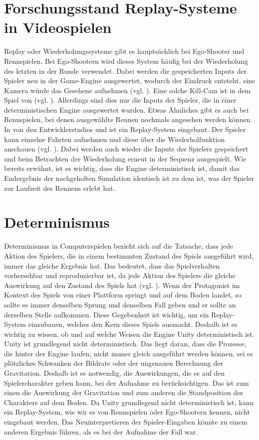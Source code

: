 \section{Forschungsstand Replay-Systeme in Videospielen}
Replay oder Wiederholungssysteme gibt es hauptsächlich bei Ego-Shooter und Rennspielen. Bei Ego-Shootern wird dieses System häufig bei der Wiederholung des letzten  in der Runde verwendet. Dabei werden die gespeicherten Inputs der Spieler neu in der Game-Engine ausgewertet, wodurch der Eindruck entsteht, eine Kamera würde das Gesehene aufnehmen (vgl. \cite{noauthor_new_nodate}). Eine solche Kill-Cam ist in dem Spiel  von  (vgl. \cite{noauthor_call_nodate}). Allerdings sind dies nur die Inputs der Spieler, die in einer deterministischen Engine ausgewertet wurden. Etwas Ähnliches gibt es auch bei Rennspielen, bei denen ausgewählte Rennen nochmals angesehen werden können. In  von den Entwicklerstudios  und  ist ein Replay-System eingebaut. Der Spieler kann einzelne Fahrten aufnehmen und diese über die Wiederholfunktion anschauen (vgl. \cite{noauthor_forza_nodate}). Dabei werden auch wieder die Inputs des Spielers gespeichert und beim Betrachten der Wiederholung erneut in der Sequenz ausgespielt. Wie bereits erwähnt, ist es wichtig, dass die Engine deterministisch ist, damit das Endergebnis der nachgeholten Simulation identisch ist zu dem ist, was der Spieler zur Laufzeit des Rennens erlebt hat. 

\section{Determinismus}
Determinismus in Computerspielen bezieht sich auf die Tatsache, dass jede Aktion des Spielers, die in einem bestimmten Zustand des Spiels ausgeführt wird, immer das gleiche Ergebnis hat. Das bedeutet, dass das Spielverhalten vorhersehbar und reproduzierbar ist, da jede Aktion des Spielers die gleiche Auswirkung auf den Zustand des Spiels hat (vgl. \cite{noauthor_game_nodate}). Wenn der Protagonist im Kontext des Spiels von einer Plattform springt und auf dem Boden landet, so sollte es immer denselben Sprung und denselben Fall geben und er sollte an derselben Stelle aufkommen.
Diese Gegebenheit ist wichtig, um ein Replay-System einzubauen, welches den Kern dieses Spiels ausmacht. Deshalb ist es wichtig zu wissen, ob und auf welche Weisen die Engine Unity deterministisch ist. 
Unity ist grundlegend nicht deterministisch. Das liegt daran, dass die Prozesse, die hinter der Engine laufen, nicht immer gleich ausgeführt werden können, sei es plötzliches Schwanken der Bildrate oder der ungenauen Berechnung der Gravitation. Deshalb ist es notwendig, die Auswirkungen, die es auf den Spielercharakter geben kann, bei der Aufnahme zu berücksichtigen. Das ist zum einen die Auswirkung der Gravitation und zum anderen die Standposition des Charakters auf dem Boden. 
Da Unity grundlegend nicht deterministisch ist, kann ein Replay-System, wie wir es von Rennspielen oder Ego-Shootern kennen, nicht eingebaut werden. Das Neuinterpretieren der Spieler-Eingaben könnte zu einem anderen Ergebnis führen, als es bei der Aufnahme der Fall war.

